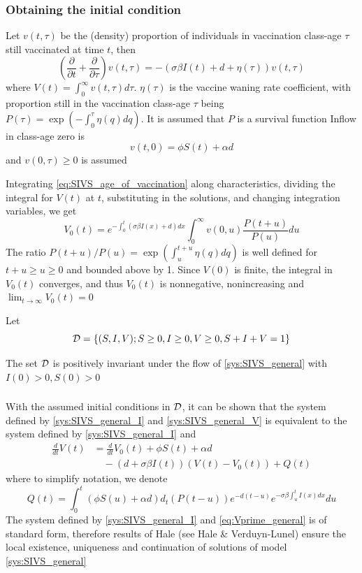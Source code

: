 \documentclass[aspectratio=169]{beamer}\usepackage[]{graphicx}\usepackage[]{xcolor}
\begin{document}
\begin{frame}\frametitle{Obtaining the initial condition}
Let $v(t,\tau)$ be the (density) proportion of individuals in vaccination class-age $\tau$ still vaccinated at time $t$,
then
\begin{equation}\label{eq:SIVS_age_of_vaccination}
\left(\frac{\partial}{\partial t}+\frac{\partial}{\partial\tau}\right)
v(t,\tau)=
-(\sigma\beta I(t)+d+\eta(\tau))v(t,\tau)
\end{equation}
where $V(t)=\int_0^\infty v(t,\tau)d\tau$. $\eta(\tau)$ is the vaccine waning rate coefficient, with proportion still in the vaccination class-age $\tau$ being $P(\tau)=\exp\left(-\int_0^\tau\eta(q)dq\right)$.
It is assumed that $P$ is a survival function
\vfill
Inflow in class-age zero is 
\[
v(t,0)=\phi S(t)+\alpha d
\]
and $v(0,\tau)\geq 0$ is assumed
\end{frame}

\begin{frame}
Integrating \eqref{eq:SIVS_age_of_vaccination} along characteristics, dividing the integral for $V(t)$ at $t$, substituting in the solutions, and changing integration variables, we get
\begin{equation}
V_0(t)=e^{-\int_0^t(\sigma\beta I(x)+d)dx} \int_0^\infty
v(0,u)\frac{P(t+u)}{P(u)}du 
\label{eq:V0}
\end{equation}
The ratio $P(t+u)/P(u)=\exp\left(\int_u^{t+u}\eta(q)dq\right)$ is well defined for $t+u\geq u\geq 0$ and bounded above by 1. 
\vfill
Since $V(0)$ is finite, the integral in $V_0(t)$ converges, and thus $V_0(t)$ is nonnegative,
nonincreasing and $\lim_{t\to\infty}V_0(t)=0$
\end{frame}

\begin{frame}
Let
\[
\mathcal{D}=\{
(S,I,V); S\geq 0, I\geq 0, V\geq 0, S+I+V=1
\}
\]
\vfill
\begin{theorem}
The set $\mathcal{D}$ is positively invariant under the flow of \eqref{sys:SIVS_general} with $I(0)>0, S(0)>0$
\label{th:invariance_gen_model}
\end{theorem}
\end{frame}


\begin{frame}\frametitle{}
With the assumed initial conditions in $\mathcal{D}$, it can be shown that the system defined by \eqref{sys:SIVS_general_I} and \eqref{sys:SIVS_general_V} is equivalent to the system defined by \eqref{sys:SIVS_general_I} and
\begin{align}
\frac{d}{dt}V(t) &= \frac{d}{dt}V_0(t)+\phi S(t)+\alpha d \label{eq:Vprime_general} \\
&\quad -(d+\sigma\beta I(t))(V(t)-V_0(t)) 
+ Q(t)\nonumber
\end{align}
where to simplify notation, we denote
\[
Q(t)=\int_0^t (\phi S(u)+\alpha d) d_t(P(t-u))e^{-d(t-u)}
e^{-\sigma\beta\int_u^t I(x)dx}du
\]
\vfill
The system defined by \eqref{sys:SIVS_general_I} and \eqref{eq:Vprime_general} is of standard form, therefore results of Hale (see Hale \& Verduyn-Lunel) ensure the local existence, uniqueness and continuation of solutions of model \eqref{sys:SIVS_general}
\end{frame}
\end{document}
